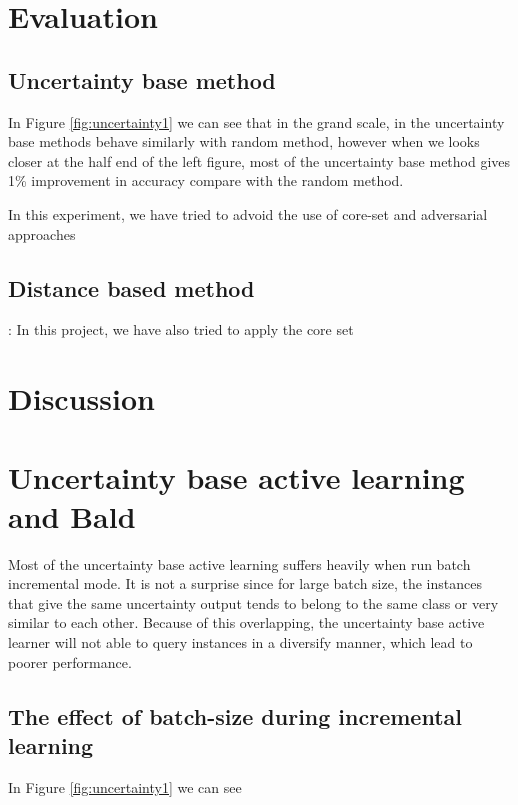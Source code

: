 \section{Evaluation}
\label{sec:Evaluation}
\subsection{Uncertainty base method}
In  Figure \ref{fig:uncertainty1} we can see that in the grand scale, in the uncertainty base methods behave similarly with random method, however when we looks closer at the half end of the left figure, most of the uncertainty base method gives 1\% improvement in accuracy compare with the random method.   

In this experiment, we have tried to advoid the use of core-set and adversarial approaches 
\subsection{Distance based method}:
In this project, we have also tried to apply the core set 
\section{Discussion}
\label{sec:Discussion}
\section{Uncertainty base active learning and Bald}
Most of the uncertainty base active learning suffers heavily when run batch incremental mode. It is not a surprise since for large batch size, the instances that give the same uncertainty output tends to belong to the same class or very similar to each other. Because of this overlapping, the uncertainty base active learner will not able to query instances in a diversify manner, which lead to poorer performance. 
\subsection{The effect of batch-size during incremental learning}
In  Figure \ref{fig:uncertainty1} we can see 


